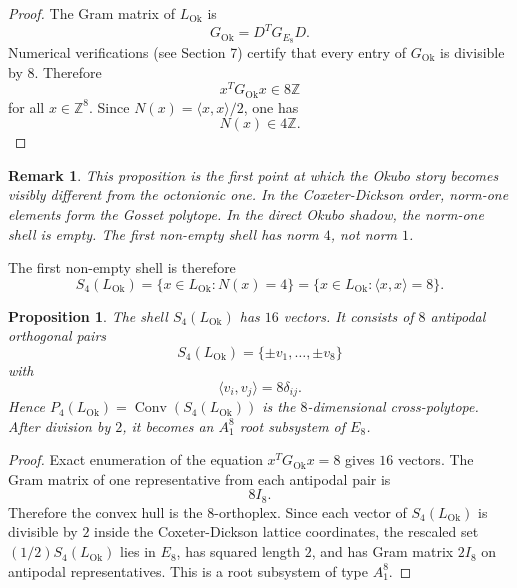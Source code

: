 \documentclass{birkjour}
\newtheorem{proposition}[theorem]{Proposition}
\newtheorem{remark}[theorem]{Remark}
\newcommand{\LOk}{L_{\mathrm{Ok}}}
\newcommand{\ZZ}{\mathbb Z}
\newcommand{\Conv}{\operatorname{Conv}}
\numberwithin{equation}{section}
\begin{document}
\begin{proof}
The Gram matrix of \(\LOk\) is
\begin{equation}
G_{\mathrm{Ok}}=D^T G_{E_8}D.
\end{equation}
Numerical verifications (see Section 7) certify that every entry of \(G_{\mathrm{Ok}}\) is
divisible by \(8\). Therefore
\begin{equation}
x^TG_{\mathrm{Ok}}x\in 8\ZZ
\end{equation}
for all \(x\in\ZZ^8\). Since \(N(x)=\langle x,x\rangle/2\), one has
\begin{equation}
N(x)\in 4\ZZ.
\end{equation}
\end{proof}

\begin{remark}
This proposition is the first point at which the Okubo story becomes visibly
different from the octonionic one. In the Coxeter-Dickson order, norm-one
elements form the Gosset polytope. In the direct Okubo shadow, the norm-one
shell is empty. The first non-empty shell has norm \(4\), not norm \(1\).
\end{remark}

The first non-empty shell is therefore
\begin{equation}
S_4(\LOk)=\{x\in\LOk:N(x)=4\}
=\{x\in\LOk:\langle x,x\rangle=8\}.
\end{equation}

\begin{proposition}
\label{prop:cross-polytope}
The shell \(S_4(\LOk)\) has \(16\) vectors. It consists of \(8\) antipodal
orthogonal pairs
\begin{equation}
S_4(\LOk)=\{\pm v_1,\ldots,\pm v_8\}
\end{equation}
with
\begin{equation}
\langle v_i,v_j\rangle=8\delta_{ij}.
\end{equation}
Hence \(P_4(\LOk)=\Conv(S_4(\LOk))\) is the \(8\)-dimensional cross-polytope.
After division by \(2\), it becomes an \(A_1^8\) root subsystem of \(E_8\).
\end{proposition}

\begin{proof}
Exact enumeration of the equation \(x^TG_{\mathrm{Ok}}x=8\) gives \(16\)
vectors. The Gram matrix of one representative from each antipodal pair is
\begin{equation}
8I_8.
\end{equation}
Therefore the convex hull is the \(8\)-orthoplex. Since each vector of
\(S_4(\LOk)\) is divisible by \(2\) inside the Coxeter-Dickson lattice
coordinates, the rescaled set \((1/2)S_4(\LOk)\) lies in \(E_8\), has squared
length \(2\), and has Gram matrix \(2I_8\) on antipodal representatives. This
is a root subsystem of type \(A_1^8\).
\end{proof}
\end{document}
